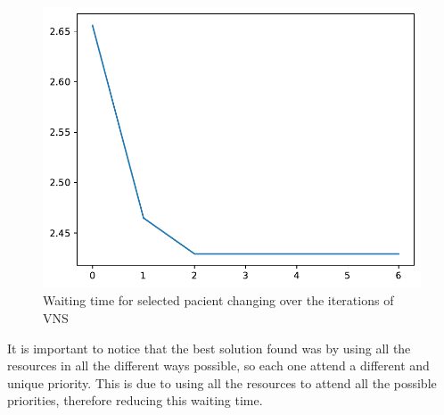 \begin{figure}
    \centering
    \includegraphics[scale=0.6]{files/opti.pdf}
    \caption{Waiting time for selected pacient changing over the iterations of VNS}
    \label{fig:optimal}
\end{figure}

It is important to notice that the best solution found was by using all the resources in all the different ways possible, so each one attend a different and unique priority. This is due to using all the resources to attend all the possible priorities, therefore reducing this waiting time.